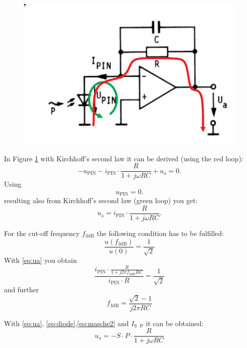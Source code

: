 \begin{figure}[h]%
\centering
\includegraphics[width=.8\columnwidth]{Grafiken/OPAMP_m.pdf}
\caption{}%
\label{fig:OPAMP}%

\end{figure}

In Figure \ref{fig:OPAMP} with Kirchhoff's second law it can be derived (using the red loop):
\begin{equation}
 - u_{\mathrm{PIN}} - i_{\mathrm{PIN}}\cdot \frac{R}{1+ j\omega RC}+u_{\mathrm{a}} = 0 .
\label{eq:masche1}
\end{equation}
Using
\begin{equation}
 u_{\mathrm{PIN}}=0.
\label{eq:masche2}
\end{equation}
resulting also from Kirchhoff's second law (green loop) you get:
\begin{equation}
 u_{\mathrm{a}} = i_{\mathrm{PIN}}\cdot \frac{R}{1+ j\omega RC}.
\label{eq:ua}
\end{equation}

For the cut-off frequency $f_{\mathrm{3dB}}$ the following condition has to be fulfilled:
\begin{equation}
 \frac{u(f_{\mathrm{3dB}})}{u(0)} = \frac{1}{\sqrt{2}}
\end{equation}
With \eqref{eq:ua} you obtain
\begin{equation}
 \frac{i_{\mathrm{PIN}}\cdot \frac{R}{1+ j2\pi f_{\mathrm{3dB}} RC}}{i_{\mathrm{PIN}}\cdot R} = \frac{1}{\sqrt{2}}
\end{equation}
and further
\begin{equation}
 f_{\mathrm{3dB}} = \frac{\sqrt{2}-1}{j2\pi RC} 
\end{equation}

With \eqref{eq:ua}, \eqref{eq:diode},\eqref{eq:masche2} and $I_{\mathrm{S\cdot P}}$ it can be obtained:
\begin{equation}
 u_{\mathrm{a}} =  -S\cdot P\cdot \frac{R}{1+ j\omega RC} 
\label{eq:}

\end{equation}

